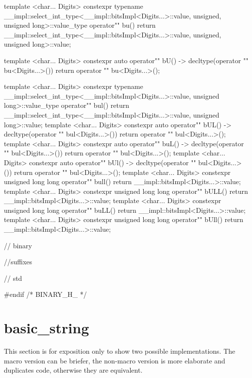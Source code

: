 \documentclass[ebook,11pt,article]{memoir}
\begin{document}
\begin{codeblock}
{{{template <char... Digits>
constexpr typename
__impl::select_int_type<__impl::bitsImpl<Digits...>::value,
      unsigned, unsigned long>::value_type
operator"" bu(){
	return 	__impl::select_int_type<__impl::bitsImpl<Digits...>::value,
			      unsigned, unsigned long>::value;
}

template <char... Digits>
constexpr auto
operator"" bU() -> decltype(operator "" bu<Digits...>()){
	return 	operator "" bu<Digits...>();
}

template <char... Digits>
constexpr typename
__impl::select_int_type<__impl::bitsImpl<Digits...>::value,
       unsigned long>::value_type
operator"" bul(){
	return 	__impl::select_int_type<__impl::bitsImpl<Digits...>::value,
			      unsigned long>::value;
}
template <char... Digits>
constexpr auto
operator"" bUL() -> decltype(operator "" bul<Digits...>()){
	return 	operator "" bul<Digits...>();
}
template <char... Digits>
constexpr auto
operator"" buL() -> decltype(operator "" bul<Digits...>()){
	return 	operator "" bul<Digits...>();
}
template <char... Digits>
constexpr auto
operator"" bUl() -> decltype(operator "" bul<Digits...>()){
	return 	operator "" bul<Digits...>();
}
template <char... Digits>
constexpr unsigned long long
operator"" bull(){
	return __impl::bitsImpl<Digits...>::value;
}
template <char... Digits>
constexpr unsigned long long
operator"" bULL(){
	return __impl::bitsImpl<Digits...>::value;
}
template <char... Digits>
constexpr unsigned long long
operator"" buLL(){
	return __impl::bitsImpl<Digits...>::value;
}
template <char... Digits>
constexpr unsigned long long
operator"" bUll(){
	return __impl::bitsImpl<Digits...>::value;
}
} // binary
} //suffixes
} // std

#endif /* BINARY_H_ */
\end{codeblock}


\section{basic_string}
This section is for exposition only to show two possible implementations. The macro version can be briefer, the non-macro version is more elaborate and duplicates code, otherwise they are equivalent. 
\end{document}
